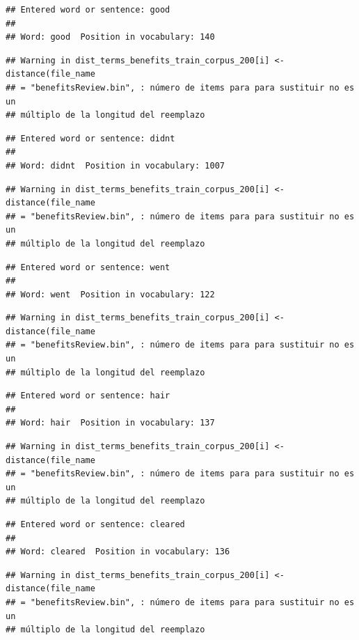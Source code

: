 \documentclass[spanish,]{article}
\begin{document}
\begin{verbatim}
## Entered word or sentence: good
## 
## Word: good  Position in vocabulary: 140
\end{verbatim}

\begin{verbatim}
## Warning in dist_terms_benefits_train_corpus_200[i] <- distance(file_name
## = "benefitsReview.bin", : número de items para para sustituir no es un
## múltiplo de la longitud del reemplazo
\end{verbatim}

\begin{verbatim}
## Entered word or sentence: didnt
## 
## Word: didnt  Position in vocabulary: 1007
\end{verbatim}

\begin{verbatim}
## Warning in dist_terms_benefits_train_corpus_200[i] <- distance(file_name
## = "benefitsReview.bin", : número de items para para sustituir no es un
## múltiplo de la longitud del reemplazo
\end{verbatim}

\begin{verbatim}
## Entered word or sentence: went
## 
## Word: went  Position in vocabulary: 122
\end{verbatim}

\begin{verbatim}
## Warning in dist_terms_benefits_train_corpus_200[i] <- distance(file_name
## = "benefitsReview.bin", : número de items para para sustituir no es un
## múltiplo de la longitud del reemplazo
\end{verbatim}

\begin{verbatim}
## Entered word or sentence: hair
## 
## Word: hair  Position in vocabulary: 137
\end{verbatim}

\begin{verbatim}
## Warning in dist_terms_benefits_train_corpus_200[i] <- distance(file_name
## = "benefitsReview.bin", : número de items para para sustituir no es un
## múltiplo de la longitud del reemplazo
\end{verbatim}

\begin{verbatim}
## Entered word or sentence: cleared
## 
## Word: cleared  Position in vocabulary: 136
\end{verbatim}

\begin{verbatim}
## Warning in dist_terms_benefits_train_corpus_200[i] <- distance(file_name
## = "benefitsReview.bin", : número de items para para sustituir no es un
## múltiplo de la longitud del reemplazo
\end{verbatim}
\end{document}
